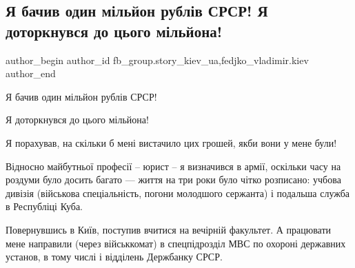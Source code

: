  
 
 
 
 
 
\subsection{Я бачив один мільйон рублів СРСР! Я доторкнувся до цього мільйона!}
\label{sec:18_11_2021.fb.fb_group.story_kiev_ua.1.million}
 
\ifcmt
 author_begin
   author_id fb_group.story_kiev_ua,fedjko_vladimir.kiev
 author_end
\fi

Я бачив один мільйон рублів СРСР! 

Я доторкнувся до цього мільйона! 

Я порахував, на скільки б мені вистачило цих грошей, якби вони у мене були!

Відносно майбутньої професії – юрист – я визначився в армії, оскільки часу на
роздуми було досить багато — життя на три роки було чітко розписано: учбова
дивізія (військова спеціальність, погони молодшого сержанта) і подальша служба
в Республіці Куба. 

Повернувшись в Київ, поступив вчитися на вечірній факультет. А працювати мене
направили (через військкомат) в спецпідрозділ МВС по охороні державних установ,
в тому числі і відділень Держбанку СРСР.

\begin{multicols}{2} %
\setlength{\parindent}{0pt}




\end{multicols} %

